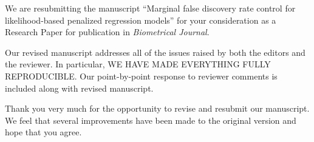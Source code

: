 \documentclass{uiletter}
\begin{document}

We are resubmitting the manuscript ``Marginal false discovery rate control for likelihood-based penalized regression models'' for your consideration as a Research Paper for publication in {\em Biometrical Journal}.

Our revised manuscript addresses all of the issues raised by both the editors and the reviewer.  In particular, WE HAVE MADE EVERYTHING FULLY REPRODUCIBLE.
Our point-by-point response to reviewer comments is included along with revised manuscript.

Thank you very much for the opportunity to revise and resubmit our manuscript.  We feel that several improvements have been made to the original version and hope that you agree.

\EndLetter
\end{document}
